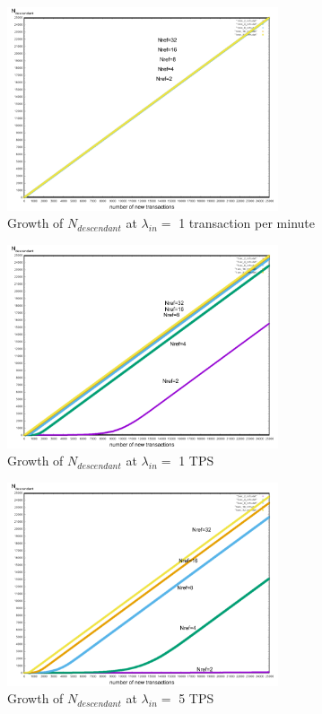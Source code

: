\documentclass[a4paper,10pt,twocolumn]{article}
\begin{document}
 \begin{figure}[ht]
	\begin{center}
		\includegraphics[width=80mm]{1min_ref.png}
		\caption{Growth of \(N_{descendant}\) at \( \lambda_{in}=\) 1 transaction per minute}
	  \label{fig:min1_ref}
	\end{center}
 \end{figure}

 \begin{figure}[ht]
	\begin{center}
		\includegraphics[width=80mm]{1sec_ref.png}
		\caption{Growth of \(N_{descendant}\)  at \( \lambda_{in}=\) 1 TPS}
	  \label{fig:sec1_ref}
	\end{center}
 \end{figure}


 \begin{figure}[ht]
	\begin{center}
		\includegraphics[width=80mm]{5sec_ref.png}
		\caption{Growth of \(N_{descendant}\)  at \( \lambda_{in}=\) 5  TPS}
	  \label{fig:sec5_ref}
	\end{center}
 \end{figure}
\end{document}
